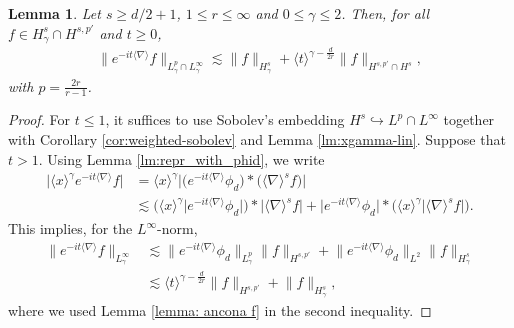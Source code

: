 \documentclass[12pt]{article}
\theoremstyle{plain}
\newtheorem{lemma}[theo]{Lemma}
\begin{document}
\begin{lemma}\label{lm:linear-bound-weighted-Lp}
Let $s\ge d/2+1$, $1\le r \le\infty$ and $0\le\gamma\le2$. Then, for all $f \in H^s_{\gamma}\cap H^{s,p'}$ and $t\ge0$,
    \begin{align*}
     \| e^{-it\langle\nabla\rangle} f\|_{L^p_\gamma\cap L^\infty_\gamma} \lesssim  \| f \|_{H^{s}_\gamma}  + \langle t \rangle^{\gamma-\frac{d}{2r}} \|  f\|_{H^{s,p'}\cap H^s},
\end{align*}
		with $p=\frac{2r}{r-1}$.
\end{lemma}




\begin{proof}
For $t\le 1$, it suffices to use Sobolev's embedding $H^s\hookrightarrow L^p\cap L^\infty$ together with Corollary \ref{cor:weighted-sobolev} and Lemma \ref{lm:xgamma-lin}. Suppose that $t>1$. Using Lemma \ref{lm:repr_with_phid}, we write
\begin{align*}
        \big|\langle x\rangle^\gamma e^{-it\langle\nabla\rangle}f\big|&=\langle x\rangle^\gamma\big|\big(e^{-it\langle\nabla\rangle}\phi_d\big)*\big(\langle\nabla\rangle^{s}f\big)\big|\\
        &\lesssim\big(\langle x\rangle^\gamma\big| e^{-it\langle\nabla\rangle}\phi_d\big|\big)*\big|\langle\nabla\rangle^{s}f\big|+\big| e^{-it\langle\nabla\rangle}\phi_d\big|*\big(\langle x\rangle^\gamma\big|\langle\nabla\rangle^{s}f\big|\big).
\end{align*}
This implies, for the $L^\infty$-norm,
\begin{align*}
        \big\| e^{-it\langle\nabla\rangle}f\big\|_{L^\infty_\gamma}
        &\lesssim\big\| e^{-it\langle\nabla\rangle}\phi_d\big\|_{L^p_\gamma}\big\|f\big\|_{H^{s,p'}}+\big\| e^{-it\langle\nabla\rangle}\phi_d\big\|_{L^2}\big\|f\big\|_{H^s_\gamma}\\
        &\lesssim\langle t\rangle^{\gamma-\frac{d}{2r}}\big\|f\big\|_{H^{s,p'}}+\big\|f\big\|_{H_\gamma^s},
\end{align*}
where we used Lemma \ref{lemma: ancona f} in the second inequality. 


\end{proof}
\end{document}
